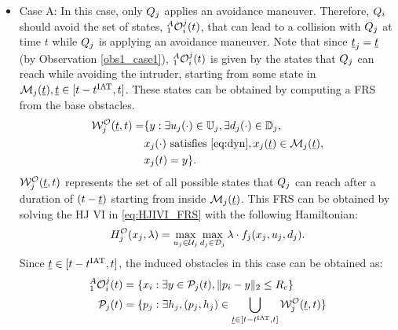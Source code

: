 \begin{itemize}[leftmargin=*] 
\item \label{sec:intruderObs_case1_caseA} Case A: In this case, only $Q_j$ applies an avoidance maneuver. Therefore, $Q_i$ should avoid the set of states, $_1^A\mathcal{O}_i^j(t)$, that can lead to a collision with $Q_j$ at time $t$ while $Q_j$ is applying an avoidance maneuver. Note that since $\underline{t}_j = \underline{t}$ (by Observation \ref{obs1_case1}), $_1^A\mathcal{O}_i^j(t)$ is given by the states that $Q_j$ can reach while avoiding the intruder, starting from some state in $\mathcal{M}_j(\underline{t}), \underline{t} \in [t-t^\text{IAT}, t]$. These states can be obtained by computing a FRS from the base obstacles.
\begin{equation} \label{eq:ObsFRS_case1_caseA}
\begin{aligned}
\frs_{j}^{\mathcal{O}}(\tsa, t) = & \{y: \exists \ctrl_j(\cdot) \in \cfset_j, \exists \dstb_j(\cdot) \in \dfset_j, \\
& \state_j(\cdot) \text{ satisfies \eqref{eq:dyn}}, \state_j(\tsa) \in \boset_j(\tsa), \\
& \state_j(t) = y\}.
\end{aligned}
\end{equation}
$\mathcal{W}_{j}^{\mathcal{O}}(\underline{t}, t)$ represents the set of all possible states that $Q_j$ can reach after a duration of $(t-\underline{t})$ starting from inside $\mathcal{M}_j(\underline{t})$. This FRS can be obtained by solving the HJ VI in \eqref{eq:HJIVI_FRS} with the following Hamiltonian:
\begin{equation}
H_{j}^{\mathcal{O}}(x_j, \lambda) = \max_{u_j \in \mathcal{U}_j} \max_{d_j \in \mathcal{D}_j} \lambda \cdot f_j (x_j, u_j, d_j).
\end{equation} 
Since $\underline{t} \in [t-t^\text{IAT}, t]$, the induced obstacles in this case can be obtained as:
\begin{equation} \label{eq:intruderObs_case1_caseA} 
\begin{aligned}
_1^A\ioset_i^j(t) & = \{\state_i: \exists y \in \pfrs_j(t), \|\pos_i - y\|_2 \le \rc \}\\
\pfrs_j(t) & = \{p_j: \exists \npos_j, (p_j, \npos_j) \in \bigcup_{\tsa \in [t-\iat, t]} \frs_{j}^{\mathcal{O}}(\tsa, t) \}
\end{aligned}
\end{equation}


\end{itemize}
